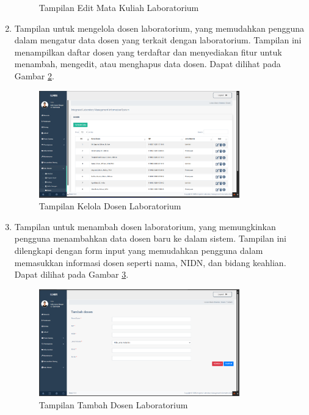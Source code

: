 \begin{enumerate}
\begin{figure}
		      \caption{Tampilan Edit Mata Kuliah Laboratorium}
		      \label{fig:edit-matkul}
	      \end{figure}
	\item Tampilan untuk mengelola dosen laboratorium, yang memudahkan pengguna dalam mengatur data dosen yang terkait dengan laboratorium. Tampilan ini menampilkan daftar dosen yang terdaftar dan menyediakan fitur untuk menambah, mengedit, atau menghapus data dosen. Dapat dilihat pada Gambar \ref{fig:dosen}.
	      \begin{figure}
		      \centering
		      \includegraphics[width=0.82\textwidth]{konten/gambar/hasil/dosen.png}
		      \caption{Tampilan Kelola Dosen Laboratorium}
		      \label{fig:dosen}
	      \end{figure}
	\item Tampilan untuk menambah dosen laboratorium, yang memungkinkan pengguna menambahkan data dosen baru ke dalam sistem. Tampilan ini dilengkapi dengan form input yang memudahkan pengguna dalam memasukkan informasi dosen seperti nama, NIDN, dan bidang keahlian. Dapat dilihat pada Gambar \ref{fig:tambah-dosen}.
	      \begin{figure}
		      \centering
		      \includegraphics[width=0.82\textwidth]{konten/gambar/hasil/tambah-dosen.png}
		      \caption{Tampilan Tambah Dosen Laboratorium}
		      \label{fig:tambah-dosen}
	      \end{figure}

\end{enumerate}
